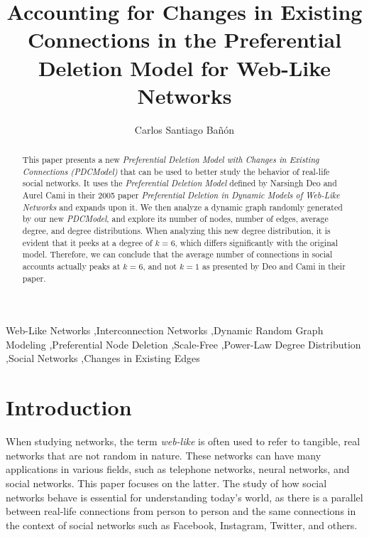 \documentclass[final,3p,times,twocolumn]{elsarticle}
\begin{document}
\begin{frontmatter}

\title{ Accounting for Changes in Existing Connections in the Preferential Deletion Model for Web-Like Networks}
\author{Carlos Santiago Bañón}
\address{College of Engineering and Computer Science - University of Central Florida - Orlando, FL}

\begin{abstract}
This paper presents a new \textit{Preferential Deletion Model with Changes in Existing Connections (PDCModel)} that can be used to better study the behavior of real-life social networks. It uses the \textit{Preferential Deletion Model} defined by Narsingh Deo and Aurel Cami in their 2005 paper \textit{Preferential Deletion in Dynamic Models of Web-Like Networks} and expands upon it. We then analyze a dynamic graph randomly generated by our new \textit{PDCModel}, and explore its number of nodes, number of edges, average degree, and degree distributions. When analyzing this new degree distribution, it is evident that it peeks at a degree of $k = 6$, which differs significantly with the original model. Therefore, we can conclude that the average number of connections in social accounts actually peaks at $k = 6$, and not $k = 1$ as presented by Deo and Cami in their paper.
\end{abstract}

\begin{keyword}
Web-Like Networks \sep Interconnection Networks \sep Dynamic Random Graph Modeling \sep Preferential Node Deletion \sep Scale-Free \sep Power-Law Degree Distribution \sep Social Networks \sep Changes in Existing Edges
\end{keyword}

\end{frontmatter}

\section{Introduction}
\label{S:1}

When studying networks, the term \textit{web-like} is often used to refer to tangible, real networks that are not random in nature. These networks can have many applications in various fields, such as telephone networks, neural networks, and social networks. This paper focuses on the latter. The study of how social networks behave is essential for understanding today's world, as there is a parallel between real-life connections from person to person and the same connections in the context of social networks such as Facebook, Instagram, Twitter, and others.
\end{document}
